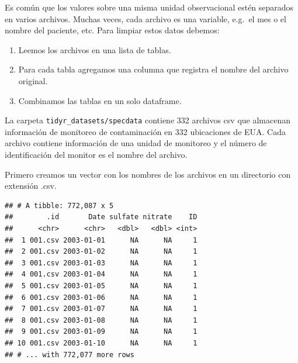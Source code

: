 \documentclass[]{article}
\newenvironment{Shaded}{\begin{snugshade}}{\end{snugshade}}
\newcommand{\KeywordTok}[1]{\textcolor[rgb]{0.13,0.29,0.53}{\textbf{{#1}}}}
\newcommand{\DataTypeTok}[1]{\textcolor[rgb]{0.13,0.29,0.53}{{#1}}}
\newcommand{\CharTok}[1]{\textcolor[rgb]{0.31,0.60,0.02}{{#1}}}
\newcommand{\StringTok}[1]{\textcolor[rgb]{0.31,0.60,0.02}{{#1}}}
\newcommand{\OtherTok}[1]{\textcolor[rgb]{0.56,0.35,0.01}{{#1}}}
\newcommand{\NormalTok}[1]{{#1}}
\providecommand{\tightlist}{%
  \setlength{\itemsep}{0pt}\setlength{\parskip}{0pt}}
\begin{document}
Es común que los valores sobre una misma unidad observacional estén
separados en varios archivos. Muchas veces, cada archivo es una
variable, e.g.~el mes o el nombre del paciente, etc. Para limpiar estos
datos debemos:

\begin{enumerate}
\def\labelenumi{\arabic{enumi}.}
\tightlist
\item
  Leemos los archivos en una lista de tablas.
\item
  Para cada tabla agregamos una columna que registra el nombre del
  archivo original.
\item
  Combinamos las tablas en un solo dataframe.
\end{enumerate}

La carpeta \texttt{tidyr\_datasets/specdata} contiene 332 archivos csv
que almacenan información de monitoreo de contaminación en 332
ubicaciones de EUA. Cada archivo contiene información de una unidad de
monitoreo y el número de identificación del monitor es el nombre del
archivo.

Primero creamos un vector con los nombres de los archivos en un
directorio con extensión .csv.

\begin{Shaded}
\end{Shaded}

\begin{verbatim}
## # A tibble: 772,087 x 5
##        .id       Date sulfate nitrate    ID
##      <chr>      <chr>   <dbl>   <dbl> <int>
##  1 001.csv 2003-01-01      NA      NA     1
##  2 001.csv 2003-01-02      NA      NA     1
##  3 001.csv 2003-01-03      NA      NA     1
##  4 001.csv 2003-01-04      NA      NA     1
##  5 001.csv 2003-01-05      NA      NA     1
##  6 001.csv 2003-01-06      NA      NA     1
##  7 001.csv 2003-01-07      NA      NA     1
##  8 001.csv 2003-01-08      NA      NA     1
##  9 001.csv 2003-01-09      NA      NA     1
## 10 001.csv 2003-01-10      NA      NA     1
## # ... with 772,077 more rows
\end{verbatim}
\end{document}
